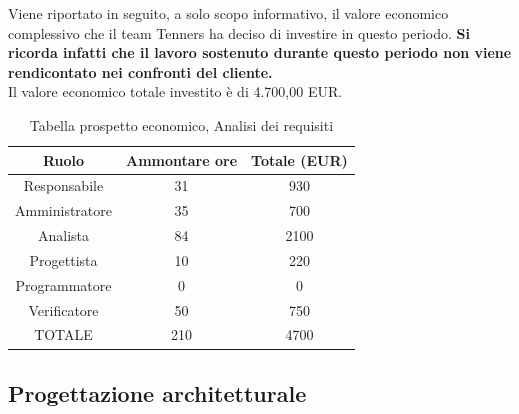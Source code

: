\noindent Viene riportato in seguito, a solo scopo informativo, il valore economico complessivo che il team Tenners ha deciso di investire in questo periodo.
\noindent \textbf{Si ricorda infatti che il lavoro sostenuto durante questo periodo non viene rendicontato nei confronti del cliente.} \\
Il valore economico totale investito è di 4.700,00 EUR.
\begin{table}[h]
	\caption{Tabella prospetto economico, Analisi dei requisiti}  
\begin{center}
\begin{tabular}{ |c|c|c|  }
 \hline
 Ruolo 		& Ammontare ore 	& Totale (EUR)\\
 	\hline
 \hline
 	Responsabile	& 31 	& 930\\
	Amministratore	& 35		& 700\\
	Analista		& 84 	& 2100\\
	Progettista		& 10		& 220\\
	Programmatore	& 0		& 0\\
	Verificatore	& 50		& 750\\
 \hline\hline
 TOTALE		& 210		& 4700\\
  \hline
\end{tabular}
\end{center}
\end{table}
\newpage
\subsection{Progettazione architetturale}
